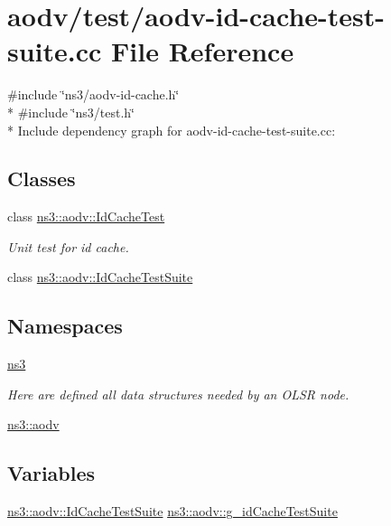 \hypertarget{aodv-id-cache-test-suite_8cc}{}\section{aodv/test/aodv-\/id-\/cache-\/test-\/suite.cc File Reference}
\label{aodv-id-cache-test-suite_8cc}
{\ttfamily \#include \char`\"{}ns3/aodv-\/id-\/cache.\+h\char`\"{}}\\*
{\ttfamily \#include \char`\"{}ns3/test.\+h\char`\"{}}\\*
Include dependency graph for aodv-\/id-\/cache-\/test-\/suite.cc\+:
\subsection*{Classes}
\begin{DoxyCompactItemize}
\item 
class \hyperlink{classns3_1_1aodv_1_1IdCacheTest}{ns3\+::aodv\+::\+Id\+Cache\+Test}
\begin{DoxyCompactList}\small\item\em Unit test for id cache. \end{DoxyCompactList}\item 
class \hyperlink{classns3_1_1aodv_1_1IdCacheTestSuite}{ns3\+::aodv\+::\+Id\+Cache\+Test\+Suite}
\end{DoxyCompactItemize}
\subsection*{Namespaces}
\begin{DoxyCompactItemize}
\item 
 \hyperlink{namespacens3}{ns3}
\begin{DoxyCompactList}\small\item\em Here are defined all data structures needed by an O\+L\+SR node. \end{DoxyCompactList}\item 
 \hyperlink{namespacens3_1_1aodv}{ns3\+::aodv}
\end{DoxyCompactItemize}
\subsection*{Variables}
\begin{DoxyCompactItemize}
\item 
\hyperlink{classns3_1_1aodv_1_1IdCacheTestSuite}{ns3\+::aodv\+::\+Id\+Cache\+Test\+Suite} \hyperlink{namespacens3_1_1aodv_aa474c1e6eccbc40ab8cb7b3eb4522b0c}{ns3\+::aodv\+::g\+\_\+id\+Cache\+Test\+Suite}
\end{DoxyCompactItemize}
